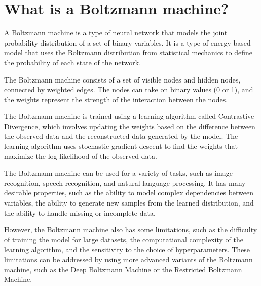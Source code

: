 \section{What is a Boltzmann machine?}
A Boltzmann machine is a type of neural network that models the joint probability distribution of a set of binary variables. It is a type of energy-based model that uses the Boltzmann distribution from statistical mechanics to define the probability of each state of the network.

The Boltzmann machine consists of a set of visible nodes and hidden nodes, connected by weighted edges. The nodes can take on binary values (0 or 1), and the weights represent the strength of the interaction between the nodes.

The Boltzmann machine is trained using a learning algorithm called Contrastive Divergence, which involves updating the weights based on the difference between the observed data and the reconstructed data generated by the model. The learning algorithm uses stochastic gradient descent to find the weights that maximize the log-likelihood of the observed data.

The Boltzmann machine can be used for a variety of tasks, such as image recognition, speech recognition, and natural language processing. It has many desirable properties, such as the ability to model complex dependencies between variables, the ability to generate new samples from the learned distribution, and the ability to handle missing or incomplete data.

However, the Boltzmann machine also has some limitations, such as the difficulty of training the model for large datasets, the computational complexity of the learning algorithm, and the sensitivity to the choice of hyperparameters. These limitations can be addressed by using more advanced variants of the Boltzmann machine, such as the Deep Boltzmann Machine or the Restricted Boltzmann Machine.

